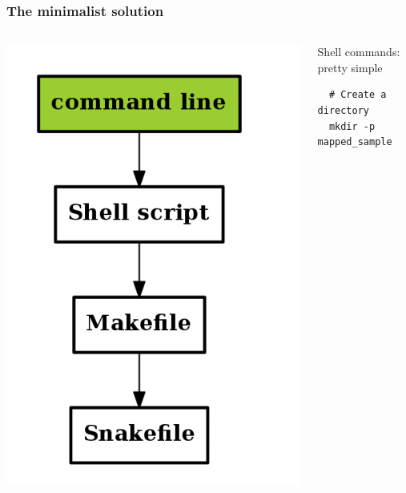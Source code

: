 \documentclass{beamer}
\begin{document}
 
 \begin{frame}
  \frametitle{The minimalist solution}

 \begin{columns}
 \begin{column}[T]{3cm}
 \includegraphics[width=1\textwidth, height=0.6\textheight]{images/flow_methods_1.png}
 \end{column}
  \begin{column}[T]{9cm}
  \begin{block}{Shell commands: pretty simple}
  \begin{lstlisting}
  # Create a directory
  mkdir -p mapped_sample
  

\end{lstlisting}
\end{block}
\end{column}
\end{columns}
\end{frame}
\end{document}
